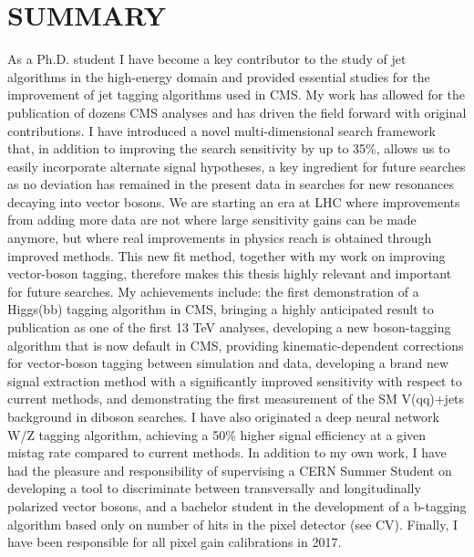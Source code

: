 \documentclass{pasa}%
\begin{document}
\section{SUMMARY}
As a Ph.D. student I have become a key contributor to the study of jet algorithms in the high-energy domain and provided essential studies for the improvement of jet tagging algorithms used in CMS. My work has allowed for the publication of dozens CMS analyses and has driven the field forward with original contributions. I have introduced a novel multi-dimensional search framework that, in addition to improving the search sensitivity by up to 35\%, allows us to easily incorporate alternate signal hypotheses, a key ingredient for future searches as no deviation has remained in the present data in searches for new resonances decaying into vector bosons. We are starting an era at LHC where improvements from adding more data are not where large sensitivity gains can be made anymore, but where real improvements in physics reach is obtained through improved methods. This new fit method, together with my work on improving vector-boson tagging, therefore makes this thesis highly relevant and important for future searches. My achievements include: the first demonstration of a Higgs(bb) tagging algorithm in CMS, bringing a highly anticipated result to publication as one of the first 13 TeV analyses, developing a new boson-tagging algorithm that is now default in CMS, providing kinematic-dependent corrections for vector-boson tagging between simulation and data, developing a brand new signal extraction method with a significantly improved sensitivity with respect to current methods, and demonstrating the first measurement of the SM V(qq)+jets background in diboson searches. I have also originated a deep neural network W/Z tagging algorithm, achieving a 50\% higher signal efficiency at a given mistag rate compared to current methods. In addition to my own work, I have had the pleasure and responsibility of supervising a CERN Summer Student on developing a tool to discriminate between transversally and longitudinally polarized vector bosons, and a bachelor student in the development of a b-tagging algorithm based only on number of hits in the pixel detector (see CV). Finally, I have been responsible for all pixel gain calibrations in 2017.



{\footnotesize
}
\end{document}
